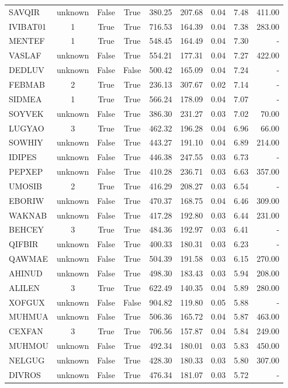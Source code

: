 \begin{scriptsize}
\begin{longtable}{l c c c r r r r r}
SAVQIR & unknown & False & True & 380.25 & 207.68 & 0.04 & 7.48 & 411.00 \\
IVIBAT01 & 1 & True & True & 716.53 & 164.39 & 0.04 & 7.38 & 283.00 \\
MENTEF & 1 & True & True & 548.45 & 164.49 & 0.04 & 7.30 & - \\
VASLAF & unknown & False & True & 554.21 & 177.31 & 0.04 & 7.27 & 422.00 \\
DEDLUV & unknown & False & False & 500.42 & 165.09 & 0.04 & 7.24 & - \\
FEBMAB & 2 & True & True & 236.13 & 307.67 & 0.02 & 7.14 & - \\
SIDMEA & 1 & True & True & 566.24 & 178.09 & 0.04 & 7.07 & - \\
SOYVEK & unknown & False & True & 386.30 & 231.27 & 0.03 & 7.02 & 70.00 \\
LUGYAO & 3 & True & True & 462.32 & 196.28 & 0.04 & 6.96 & 66.00 \\
SOWHIY & unknown & False & True & 443.27 & 191.10 & 0.04 & 6.89 & 214.00 \\
IDIPES & unknown & False & True & 446.38 & 247.55 & 0.03 & 6.73 & - \\
PEPXEP & unknown & False & True & 410.28 & 236.71 & 0.03 & 6.63 & 357.00 \\
UMOSIB & 2 & True & True & 416.29 & 208.27 & 0.03 & 6.54 & - \\
EBORIW & unknown & False & True & 470.37 & 168.75 & 0.04 & 6.46 & 309.00 \\
WAKNAB & unknown & False & True & 417.28 & 192.80 & 0.03 & 6.44 & 231.00 \\
BEHCEY & 3 & True & True & 484.36 & 192.97 & 0.03 & 6.41 & - \\
QIFBIR & unknown & False & True & 400.33 & 180.31 & 0.03 & 6.23 & - \\
QAWMAE & unknown & False & True & 504.39 & 191.58 & 0.03 & 6.15 & 270.00 \\
AHINUD & unknown & False & True & 498.30 & 183.43 & 0.03 & 5.94 & 208.00 \\
ALILEN & 3 & True & True & 622.49 & 140.35 & 0.04 & 5.89 & 280.00 \\
XOFGUX & unknown & False & False & 904.82 & 119.80 & 0.05 & 5.88 & - \\
MUHMUA & unknown & False & True & 506.36 & 165.72 & 0.04 & 5.87 & 463.00 \\
CEXFAN & 3 & True & True & 706.56 & 157.87 & 0.04 & 5.84 & 249.00 \\
MUHMOU & unknown & False & True & 492.34 & 180.01 & 0.03 & 5.83 & 450.00 \\
NELGUG & unknown & False & True & 428.30 & 180.33 & 0.03 & 5.80 & 307.00 \\
DIVROS & unknown & False & True & 476.34 & 181.07 & 0.03 & 5.72 & - \\
\end{longtable}
\end{scriptsize}
